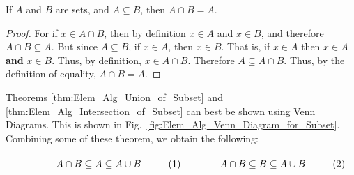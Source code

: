             \begin{theorem}
                \label{thm:Elem_Alg_Intersection_of_Subset}
                If $A$ and $B$ are sets, and $A\subseteq{B}$,
                then $A\cap{B}=A$.
            \end{theorem}
            \begin{proof}
                For if $x\in{A}\cap{B}$, then by
                definition $x\in{A}$ and $x\in{B}$,
                and therefore ${A}\cap{B}\subseteq{A}$.
                But since $A\subseteq{B}$, if
                $x\in{A}$, then $x\in{B}$. That is, if
                $x\in{A}$ then $x\in{A}$ \textbf{and} $x\in{B}$.
                Thus, by definition, $x\in{A}\cap{B}$.
                Therefore $A\subseteq{A}\cap{B}$. Thus, by
                the definition of equality,
                $A\cap{B}=A$.
            \end{proof}
            Theorems \ref{thm:Elem_Alg_Union_of_Subset} and
            \ref{thm:Elem_Alg_Intersection_of_Subset} can best
            be shown using Venn Diagrams. This is shown
            in Fig.~\ref{fig:Elem_Alg_Venn_Diagram_for_Subset}.
            Combining some of these theorem, we obtain the
            following:
            \par
            \vspace{1ex}
            \begin{subequations}
                \begin{minipage}{0.49\textwidth}
                    \begin{equation}
                        A\cap{B}\subseteq{A}\subseteq{A}\cup{B}
                    \end{equation}
                \end{minipage}
                \hfill
                \begin{minipage}{0.49\textwidth}
                    \begin{equation}
                        A\cap{B}\subseteq{B}\subseteq{A}\cup{B}
                    \end{equation}
                \end{minipage}
            \end{subequations}
            \par
